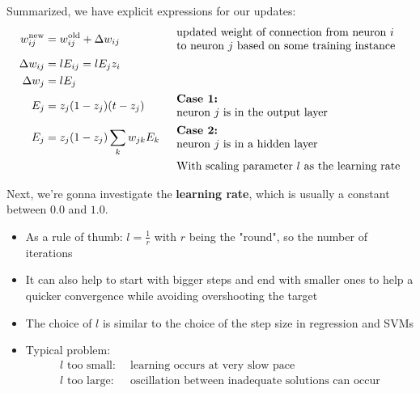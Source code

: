 Summarized, we have explicit expressions for our updates:
\begin{align*}
  w_{ij}^\text{new} &= w_{ij}^\text{old} + \Delta w_{ij} 
    && \begin{array}{l} \text{updated weight of connection from neuron } i \\ \text{to neuron } j \text{ based on some training instance} \end{array}\\
  \Delta w_{ij} &= l E_{ij} = l E_j z_i\\
  \Delta w_{j} &= l E_{j}\\
  E_{j} &= z_j (1-z_j) (t-z_j) 
    && \begin{array}{l} \text{\textbf{Case 1:}} \\ \text{neuron } j \text{ is in the output layer} \end{array}\\
  E_{j} &= z_j (1-z_j) \sum_k w_{jk} E_k
    && \begin{array}{l} \text{\textbf{Case 2:}} \\ \text{neuron } j \text{ is in a hidden layer} \end{array}\\
    &&& \,\text{ With scaling parameter } l \text{ as the learning rate}
\end{align*}

Next, we're gonna investigate the \textbf{learning rate}, which is usually a constant between $0.0$ and $1.0$.
\begin{itemize}
  \item As a rule of thumb: $l=\frac{1}{r}$ with $r$ being the "round", so the number of iterations
  \item It can also help to start with bigger steps and end with smaller ones to help a quicker convergence while avoiding overshooting the target
  \item The choice of $l$ is similar to the choice of the step size in regression and SVMs
  \item Typical problem:
  \begin{align*}
    l \text{ too small}: & \text{ learning occurs at very slow pace}\\
    l \text{ too large}: & \text{ oscillation between inadequate solutions can occur}
  \end{align*}
\end{itemize}


